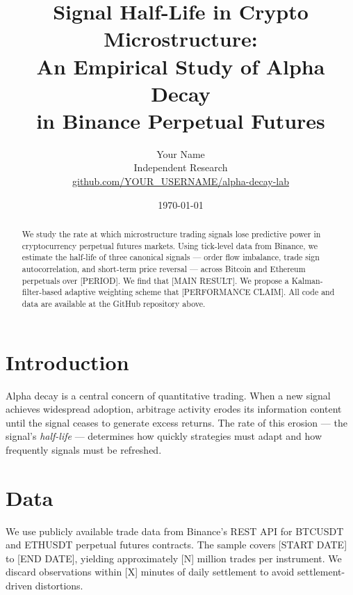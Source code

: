 \documentclass[12pt]{article}
\title{Signal Half-Life in Crypto Microstructure:\\
       An Empirical Study of Alpha Decay\\
       in Binance Perpetual Futures}
\author{Your Name\\
\small Independent Research\\
\small \href{https://github.com/YOUR_USERNAME/alpha-decay-lab}{github.com/YOUR\_USERNAME/alpha-decay-lab}}
\date{\today}
\begin{document}
\maketitle

\begin{abstract}
We study the rate at which microstructure trading signals lose predictive power
in cryptocurrency perpetual futures markets. Using tick-level data from Binance,
we estimate the half-life of three canonical signals --- order flow imbalance,
trade sign autocorrelation, and short-term price reversal --- across
Bitcoin and Ethereum perpetuals over [PERIOD]. 
We find that [MAIN RESULT]. We propose a Kalman-filter-based adaptive weighting
scheme that [PERFORMANCE CLAIM]. 
All code and data are available at the GitHub repository above.
\end{abstract}

\section{Introduction}
\label{sec:intro}


Alpha decay is a central concern of quantitative trading. When a new
signal achieves widespread adoption, arbitrage activity erodes its
information content until the signal ceases to generate excess returns.
The rate of this erosion --- the signal's \emph{half-life} --- determines
how quickly strategies must adapt and how frequently signals must be
refreshed.

\section{Data}
\label{sec:data}


We use publicly available trade data from Binance's REST API for
BTCUSDT and ETHUSDT perpetual futures contracts. The sample covers
[START DATE] to [END DATE], yielding approximately [N] million trades
per instrument. We discard observations within [X] minutes of daily
settlement to avoid settlement-driven distortions.
\end{document}
